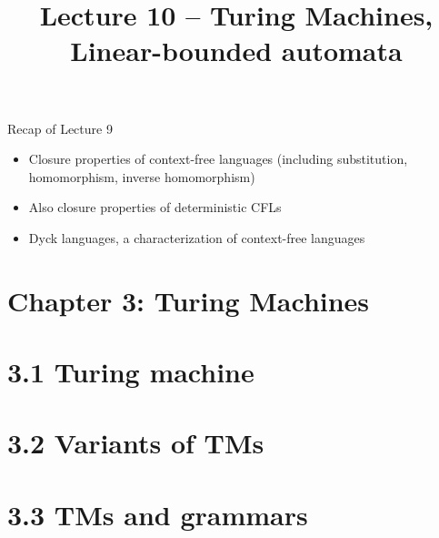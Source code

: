 \documentclass[handout]{beamer}
\title{Lecture 10 -- Turing Machines, Linear-bounded automata}
\begin{document}
\frame{\titlepage}


\begin{frame}{Recap of Lecture 9}
	
    \begin{itemize}        
        \item Closure properties of context-free languages (including substitution, homomorphism, inverse homomorphism)
        \item Also closure properties of deterministic CFLs
        \item Dyck languages, a characterization of context-free languages
    \end{itemize}
	
\end{frame}


\section{\sc Chapter 3: Turing Machines}


\section{3.1 Turing machine}


\section{3.2 Variants of TMs}


\section{3.3 TMs and grammars}
\end{document}

